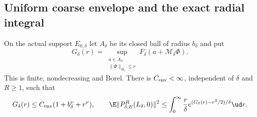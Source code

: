 \subsection{Uniform coarse envelope and the exact radial integral}

\begin{proposition}
  \label{P:tube-coarse-envelope}
  On the actual support $E_{0,\delta}$ let $A_\delta$ be its
  closed ball of radius $b_\delta$ and put
  \[
    G_\delta(r)=
    \sup_{\substack{a\in A_\delta\\\|\Phi\|_{H_I}\le r}}
    F_\delta(a+\mathcal M_\delta\Phi).
  \]
  This is finite, nondecreasing and Borel.
  There is $C_{\rm env}<\infty$, independent of $\delta$ and $R\ge1$,
  such that
  \begin{equation}\label{E:tube-coarse-envelope}
    G_\delta(r)\le C_{\rm env}(1+b_\delta^\nu+r^\nu),\qquad
    \E\|P_{\delta,E}^R(L_\delta,0)\|^2
    \le\int_0^\infty\frac r\delta
    e^{(G_\delta(r)-r^2/2)/\delta}\ud r .
  \end{equation}
\end{proposition}

